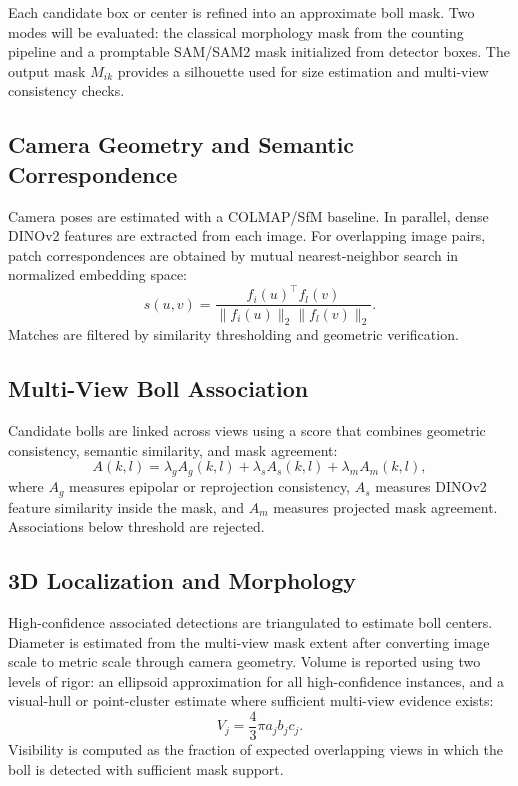 Each candidate box or center is refined into an approximate boll mask. Two modes will be evaluated: the classical morphology mask from the counting pipeline and a promptable SAM/SAM2 mask initialized from detector boxes. The output mask $M_{ik}$ provides a silhouette used for size estimation and multi-view consistency checks.

\subsection{Camera Geometry and Semantic Correspondence}

Camera poses are estimated with a COLMAP/SfM baseline. In parallel, dense DINOv2 features are extracted from each image. For overlapping image pairs, patch correspondences are obtained by mutual nearest-neighbor search in normalized embedding space:
\begin{equation}
s(u,v) =
\frac{f_i(u)^\top f_l(v)}
{\lVert f_i(u) \rVert_2 \lVert f_l(v) \rVert_2}.
\end{equation}
Matches are filtered by similarity thresholding and geometric verification.

\subsection{Multi-View Boll Association}

Candidate bolls are linked across views using a score that combines geometric consistency, semantic similarity, and mask agreement:
\begin{equation}
A(k,l) =
\lambda_g A_g(k,l) +
\lambda_s A_s(k,l) +
\lambda_m A_m(k,l),
\end{equation}
where $A_g$ measures epipolar or reprojection consistency, $A_s$ measures DINOv2 feature similarity inside the mask, and $A_m$ measures projected mask agreement. Associations below threshold are rejected.

\subsection{3D Localization and Morphology}

High-confidence associated detections are triangulated to estimate boll centers. Diameter is estimated from the multi-view mask extent after converting image scale to metric scale through camera geometry. Volume is reported using two levels of rigor: an ellipsoid approximation for all high-confidence instances, and a visual-hull or point-cluster estimate where sufficient multi-view evidence exists:
\begin{equation}
V_j = \frac{4}{3}\pi a_j b_j c_j.
\end{equation}
Visibility is computed as the fraction of expected overlapping views in which the boll is detected with sufficient mask support.
